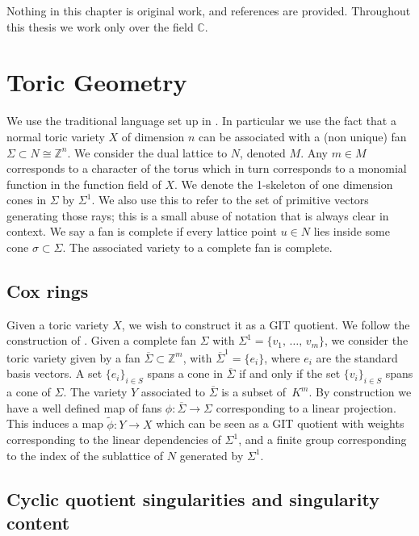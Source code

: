 \documentclass[12pt]{amsbook}
\theoremstyle{plain}
\newcommand{\mb}[1]{\mathbb{#1}}
\newcommand{\ra}{\rightarrow}
\begin{document}
 





\setcounter{chapter}{2}
Nothing in this chapter is original work, and references are provided. Throughout this thesis we work only over the field $\mb{C}$.
\section{Toric Geometry}

We use the traditional language set up in \cite{cox}. In particular we use the fact that a normal toric variety $X$ of dimension $n$ can be associated with a (non unique) fan $\Sigma \subset N \cong \mb{Z}^n$. We consider the dual lattice to $N$, denoted $M$. Any $m \in M$ corresponds to a character of the torus which in turn corresponds to a monomial function in the function field of $X$. We denote the 1-skeleton of one dimension cones in $\Sigma$ by $\Sigma^1$. We also use this to refer to the set of primitive vectors generating those rays; this is a small abuse of notation that is always clear in context. We say a fan is complete if every lattice point $u \in N$ lies inside some cone $\sigma \subset \Sigma$. The associated variety to a complete fan is complete.
\subsection{Cox rings}
Given a toric variety $X$, we wish to construct it as a GIT quotient. We follow the construction of \cite{cox}. Given a complete fan $\Sigma$ with $\Sigma^1 = \{ v_1, \, \dots , \, v_m\}$, we consider the toric variety given by a fan $\overline{\Sigma} \subset \mb{Z}^m$, with
$\overline{\Sigma}^1 = \{e_i\}$, where $e_i$ are the standard basis vectors. A set $\{e_i\}_{i \in S}$ spans a cone in $\overline{\Sigma}$ if and only if the set $\{v_i \}_{i \in S}$ spans a cone of $\Sigma$. The variety $Y$ associated to $\overline{\Sigma}$ is a subset of~$K^m$. By construction we have a well defined map of fans $\phi \colon \overline{\Sigma} \ra \Sigma$ corresponding to a linear projection. This induces a map $\tilde{\phi} \colon Y \ra X$ which can be seen as a GIT quotient with weights corresponding to the linear dependencies of $\Sigma^1$, and a finite group corresponding to the index of the sublattice of $N$ generated by $\Sigma^1$.

\subsection{Cyclic quotient singularities and singularity content}
\end{document}
